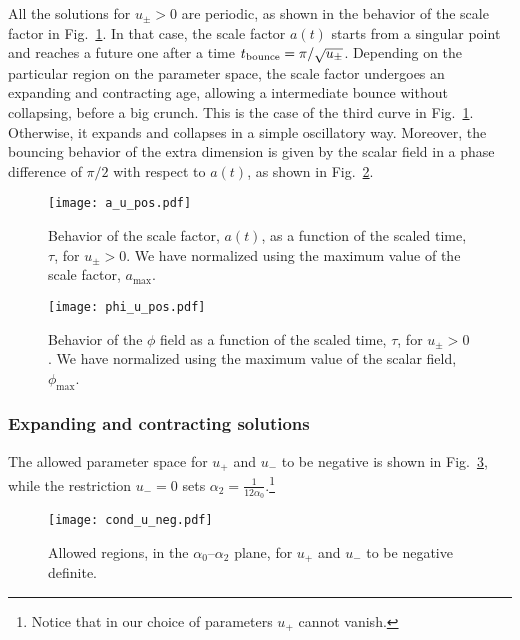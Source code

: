 \documentclass[aps,prd,12pt,superscriptaddress,showpacs,showkeys,reprint,nofootinbib]{revtex4-1}
\begin{document}
All the solutions for $u_\pm>0$ are periodic, as shown in the behavior of the scale factor in Fig.~\ref{a_u_pos}. In that case, the scale factor $a(t)$ starts from a singular point and reaches a future one after a time $t_{\rm bounce}=\pi/\sqrt{u_\pm}$. Depending on the particular region on the parameter space, the scale factor undergoes an expanding and contracting age, allowing a intermediate bounce without collapsing, before a big crunch. This is the case of the third curve in Fig.~\ref{a_u_pos}. Otherwise, it expands and collapses in a {simple} oscillatory way.
Moreover, the bouncing behavior of the extra dimension is given by the scalar field in a phase difference of $\pi/2$ with respect to $a(t)$, as shown in Fig.~\ref{phi_u_pos}. %
\begin{figure}[H]
  \texttt{[image: a\_u\_pos.pdf]}
  \caption{Behavior of the scale factor, \(a(t)\), as a function of the scaled time, $\tau$, for $u_\pm > 0$. We have normalized using the maximum value of the scale factor, $a_{\mathrm{max}}$.}
  \label{a_u_pos}
\end{figure}
\begin{figure}[H]
  \texttt{[image: phi\_u\_pos.pdf]}
  \caption{Behavior of the $\phi$ field as a function of the scaled time, $\tau$, for $u_\pm > 0$. We have normalized using the maximum value of the scalar field, $\phi_{\mathrm{max}}$.}
  \label{phi_u_pos}
\end{figure}

\subsubsection{Expanding and contracting solutions}

The allowed parameter space for $u_+$ and $u_-$ to be negative is shown in Fig.~\ref{cond_u_neg}, while the restriction $u_- = 0$ sets $\alpha_2 = \tfrac{1}{12 \alpha_0}$.\footnote{Notice that in our choice of parameters $u_+$ cannot vanish.}

\begin{figure}[H]
  \texttt{[image: cond\_u\_neg.pdf]}
  \caption{Allowed regions, in the $\alpha_0$--$\alpha_2$ plane, for $u_+$ and $u_-$ to be negative definite.}
  \label{cond_u_neg}  
\end{figure}
\end{document}
